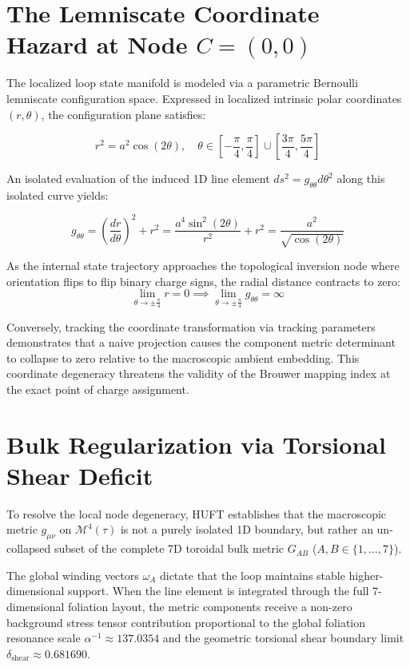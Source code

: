 \documentclass[11pt,a4paper]{article}
\begin{document}
\section{The Lemniscate Coordinate Hazard at Node $C=(0,0)$}
The localized loop state manifold is modeled via a parametric Bernoulli lemniscate configuration space. Expressed in localized intrinsic polar coordinates $(r, \theta)$, the configuration plane satisfies:

\begin{equation}
    r^2 = a^2 \cos(2\theta), \quad \theta \in \left[-\frac{\pi}{4}, \frac{\pi}{4}\right] \cup \left[\frac{3\pi}{4}, \frac{5\pi}{4}\right]
\end{equation}

An isolated evaluation of the induced 1D line element $ds^2 = g_{\theta\theta}d\theta^2$ along this isolated curve yields:

\begin{equation}
    g_{\theta\theta} = \left(\frac{dr}{d\theta}\right)^2 + r^2 = \frac{a^4 \sin^2(2\theta)}{r^2} + r^2 = \frac{a^2}{\sqrt{\cos(2\theta)}}
\end{equation}

As the internal state trajectory approaches the topological inversion node where orientation flips to flip binary charge signs, the radial distance contracts to zero:
\begin{equation}
    \lim_{\theta \to \pm \frac{\pi}{4}} r = 0 \implies \lim_{\theta \to \pm \frac{\pi}{4}} g_{\theta\theta} = \infty
\end{equation}

Conversely, tracking the coordinate transformation via tracking parameters demonstrates that a naive projection causes the component metric determinant to collapse to zero relative to the macroscopic ambient embedding. This coordinate degeneracy threatens the validity of the Brouwer mapping index at the exact point of charge assignment.

\section{Bulk Regularization via Torsional Shear Deficit}
To resolve the local node degeneracy, HUFT establishes that the macroscopic metric $g_{\mu\nu}$ on $\mathcal{M}^4(\tau)$ is not a purely isolated 1D boundary, but rather an un-collapsed subset of the complete 7D toroidal bulk metric $G_{AB}$ ($A,B \in \{1, \dots, 7\}$).

The global winding vectors $\omega_A$ dictate that the loop maintains stable higher-dimensional support. When the line element is integrated through the full 7-dimensional foliation layout, the metric components receive a non-zero background stress tensor contribution proportional to the global foliation resonance scale $\alpha^{-1} \approx 137.0354$ and the geometric torsional shear boundary limit $\delta_{\text{shear}} \approx 0.681690$.
\end{document}

